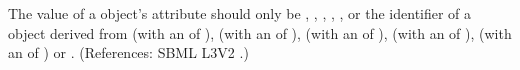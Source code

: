 The value of a \Species object's  attribute should
only be  , ,
, , ,  or the
identifier of a \UnitDefinition object derived from  (with an
 of ),  (with an  of
),  (with an  of ), 
(with an  of ),  (with an
 of ) or .  (References: SBML
L3V2 .)
